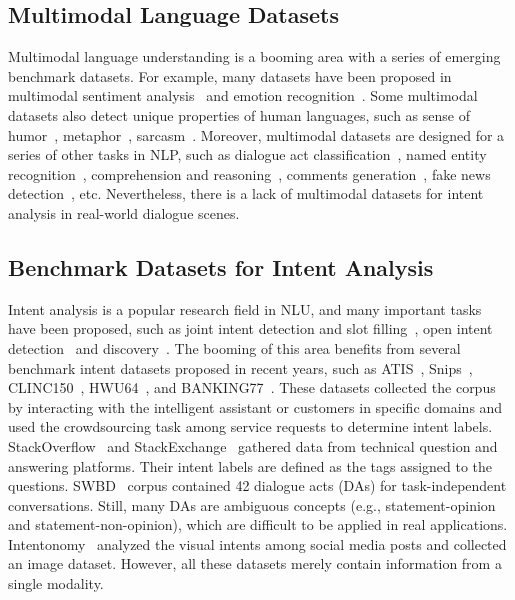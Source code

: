 \documentclass[sigconf,camera-ready]{acmart}
\begin{document}
\subsection{Multimodal Language Datasets}
Multimodal language understanding is a booming area with a series of emerging benchmark datasets. For example, many datasets have been proposed in multimodal sentiment analysis~\cite{busso2008iemocap,MOSI,MOSEI,yu-etal-2020-ch} and emotion recognition~\cite{poria2019meld}. Some multimodal datasets also detect unique properties of human languages, such as sense of humor~\cite{ hasan2021humor, hasan2019ur}, metaphor~\cite{zhang-etal-2021-multimet}, sarcasm~\cite{castro-etal-2019-towards,cai-etal-2019-multi}. Moreover, multimodal datasets are designed for a series of other tasks in NLP, such as dialogue act classification~\cite{saha2020towards,saha2021emotion}, named entity recognition~\cite{sui-etal-2021-large}, comprehension and reasoning~\cite{yagcioglu-etal-2018-recipeqa,wang-etal-2019-youmakeup}, comments generation~\cite{wang2020videoic}, fake news detection~\cite{nakamura2020fakeddit}, etc. Nevertheless, there is a lack of multimodal datasets for intent analysis in real-world dialogue scenes.

\subsection{Benchmark Datasets for Intent Analysis}
Intent analysis is a popular research field in NLU, and many important tasks have been proposed, such as joint intent detection and slot filling~\cite{qin-etal-2019-stack,zhang2019joint}, open intent detection~\cite{lin-xu-2019-deep,Zhang_Xu_Lin_2021} and discovery~\cite{lin2020discovering,Zhang_Xu_Lin_Lyu_2021}. The booming of this area benefits from several benchmark intent datasets proposed in recent years, such as  ATIS~\cite{hemphill1990atis}, Snips~\cite{coucke2018snips}, CLINC150~\cite{larson2019evaluation}, HWU64~\cite{liu2019benchmarking}, and BANKING77~\cite{casanueva2020efficient}. These datasets collected the corpus by interacting with the intelligent assistant or customers in specific domains and used the crowdsourcing task among service requests to determine intent labels. StackOverflow~\cite{xu-etal-2015-short} and StackExchange~\cite{braun-etal-2017-evaluating} gathered data from technical question and answering platforms. Their intent labels are defined as the tags assigned to the questions. SWBD~\cite{godfrey1992switchboard} corpus contained 42 dialogue acts (DAs) for task-independent conversations. Still, many DAs are ambiguous concepts (e.g., statement-opinion and statement-non-opinion), which are difficult to be applied in real applications. Intentonomy~\cite{jia2021intentonomy} analyzed the visual intents among social media posts and collected an image dataset. However, all these datasets merely contain information from a single modality.
\end{document}
